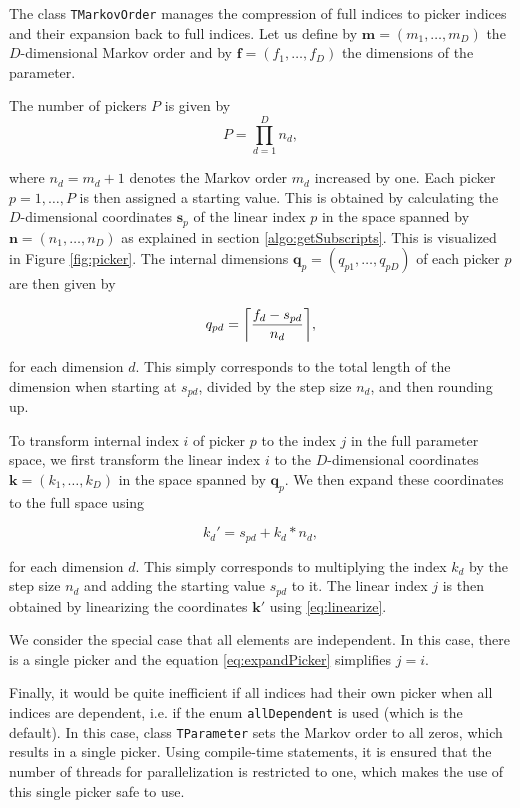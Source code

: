 \documentclass[a4paper,11pt]{article}
\def\f{\boldsymbol{f}}
\def\k{\boldsymbol{k}}
\def\m{\boldsymbol{m}}
\def\n{\boldsymbol{n}}
\def\q{\boldsymbol{q}}
\def\s{\boldsymbol{s}}
\newcommand{\class}[1]{\texttt{#1}}
\newcommand{\type}[1]{\texttt{#1}}
\DeclarePairedDelimiter{\ceil}{\lceil}{\rceil}
\begin{document}
The class \class{TMarkovOrder} manages the compression of full indices to picker indices and their expansion back to full indices. Let us define by $\m = (m_1, \ldots, m_D)$ the $D$-dimensional Markov order and by $\f = (f_1, \ldots, f_D)$ the dimensions of the parameter.

The number of pickers $P$ is given by
\begin{equation*}
 P = \prod_{d=1}^D n_d,
\end{equation*}

where $n_d = m_d + 1$ denotes the Markov order $m_d$ increased by one.
Each picker $p = 1, \ldots, P$ is then assigned a starting value. This is obtained by calculating the $D$-dimensional coordinates $\s_p$ of the linear index $p$ in the space spanned by $\n = (n_1, \ldots, n_D)$ as explained in section \ref{algo:getSubscripts}. This is visualized in Figure \ref{fig:picker}. The internal dimensions $\q_p = (q_{p1}, \ldots, q_{pD})$ of each picker $p$ are then given by

\begin{equation*}
 q_{pd} = \ceil[\bigg]{\frac{f_d - s_{pd}}{n_d}},
\end{equation*}

for each dimension $d$. This simply corresponds to the total length of the dimension when starting at $s_{pd}$, divided by the step size $n_d$, and then rounding up.

To transform internal index $i$ of picker $p$ to the index $j$ in the full parameter space, we first transform the linear index $i$ to the $D$-dimensional coordinates $\k = (k_1, \ldots, k_D)$ in the space spanned by $\q_p$. We then expand these coordinates to the full space using

\begin{equation}\label{eq:expandPicker}
 k_{d}' = s_{pd} + k_d * n_d,
\end{equation}

for each dimension $d$. This simply corresponds to multiplying the index $k_d$ by the step size $n_d$ and adding the starting value $s_{pd}$ to it. The linear index $j$ is then obtained by linearizing the coordinates $\k'$ using \eqref{eq:linearize}.

We consider the special case that all elements are independent. In this case, there is a single picker and the equation \eqref{eq:expandPicker} simplifies $j=i$.

Finally, it would be quite inefficient if all indices had their own picker when all indices are dependent, i.e. if the enum \type{allDependent} is used (which is the default). In this case, class \class{TParameter} sets the Markov order to all zeros, which results in a single picker. Using compile-time statements, it is ensured that the number of threads for parallelization is restricted to one, which makes the use of this single picker safe to use.
\end{document}
